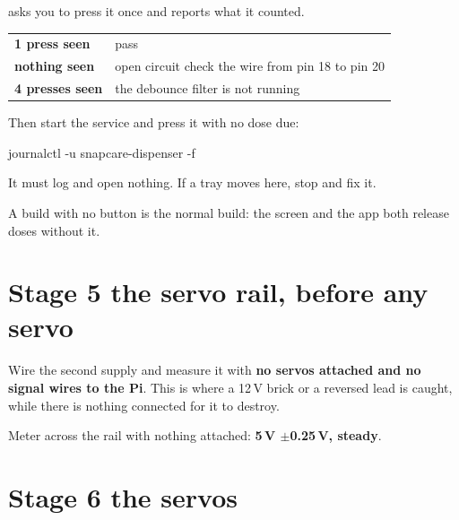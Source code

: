 \documentclass[11pt]{article}
\begin{document}
\begin{provebox}
\provetitle
{} asks you to press it once and reports what it counted.

\vspace{1.5ex}
\begin{tabular}{@{}>{\bfseries}l l@{}}
1 press seen   & pass \\
nothing seen   & open circuit \textemdash{} check the wire from pin 18 to pin 20 \\
4 presses seen & the debounce filter is not running \\
\end{tabular}

\vspace{1.5ex}
Then start the service and press it with no dose due:
\begin{shell}
journalctl -u snapcare-dispenser -f
\end{shell}
It must log  and open nothing. If a
tray moves here, stop and fix it.
\end{provebox}

\vspace{1mm}
\noindent A build with no button is the normal build: the screen and the app
both release doses without it.

\clearpage

\section{Stage 5 \textemdash{} the servo rail, before any servo}

Wire the second supply and measure it with \textbf{no servos attached and no
signal wires to the Pi}. This is where a 12\,V brick or a reversed lead is
caught, while there is nothing connected for it to destroy.

\begin{provebox}
\provetitle
Meter across the rail with nothing attached: \textbf{5\,V $\pm$0.25\,V, steady}.
\end{provebox}

\section{Stage 6 \textemdash{} the servos}
\end{document}
